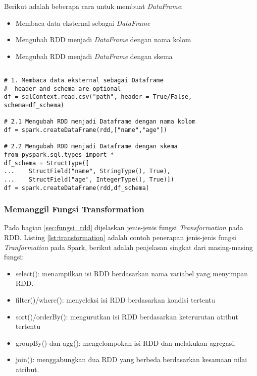\noindent Berikut adalah beberapa cara untuk membuat \textit{DataFrame}:
\begin{itemize}
\item Membaca data eksternal sebagai \textit{DataFrame}
\item Mengubah RDD menjadi \textit{DataFrame} dengan nama kolom
\item Mengubah RDD menjadi \textit{DataFrame} dengan skema
\end{itemize}
\begin{lstlisting}[basicstyle=\ttfamily, frame=single,
	columns=fullflexible, keepspaces=true, breaklines=true, label=ls_kepatuhan_1_1_1_logo_sharif_judge, caption=Cara Pembuatan Dataframe]
	
# 1. Membaca data eksternal sebagai Dataframe
#  header and schema are optional
df = sqlContext.read.csv("path", header = True/False, schema=df_schema)

# 2.1 Mengubah RDD menjadi Dataframe dengan nama kolom
df = spark.createDataFrame(rdd,["name","age"])

# 2.2 Mengubah RDD menjadi Dataframe dengan skema
from pyspark.sql.types import *
df_schema = StructType([
...    StructField("name", StringType(), True),
...    StructField("age", IntegerType(), True)])
df = spark.createDataFrame(rdd,df_schema)

\end{lstlisting}

\newpage
\subsubsection{Memanggil Fungsi Transformation}
\noindent Pada bagian \ref{sec:fungsi_rdd} dijelaskan jenis-jenis fungsi \textit{Transformation} pada RDD. Listing \ref{lst:transformation} adalah contoh penerapan jenis-jenis fungsi \textit{Tranformation} pada Spark, berikut adalah penjelasan singkat dari masing-masing fungsi:
\begin{itemize}
\item select(): menampilkan isi RDD berdasarkan nama variabel yang menyimpan RDD.
\item filter()/where(): menyeleksi isi RDD berdasarkan kondisi tertentu
\item sort()/orderBy(): mengurutkan isi RDD berdasarkan keterurutan atribut tertentu
\item groupBy() dan agg(): mengelompokan isi RDD dan melakukan agregasi.
\item join(): menggabungkan dua RDD yang berbeda berdasarkan kesamaan nilai atribut.
\end{itemize}


